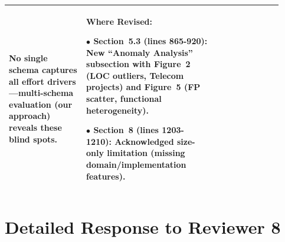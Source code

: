 \documentclass[11pt,a4paper]{article}
\begin{document}
\begin{longtable}{>{\raggedright\arraybackslash}p{0.26\linewidth}|>{\raggedright\arraybackslash}p{0.44\linewidth}|>{\raggedright\arraybackslash}p{0.22\linewidth}}
No single schema captures all effort drivers---\textbf{multi-schema evaluation} (our approach) reveals these blind spots. &

\textbf{Where Revised:}

$\bullet$ \textbf{Section~5.3} (lines 865-920): New ``Anomaly Analysis'' subsection with Figure~2 (LOC outliers, Telecom projects) and Figure~5 (FP scatter, functional heterogeneity).

$\bullet$ \textbf{Section~8} (lines 1203-1210): Acknowledged size-only limitation (missing domain/implementation features). \\

\bottomrule
\end{longtable}



\section*{Detailed Response to Reviewer 8}
\end{document}
